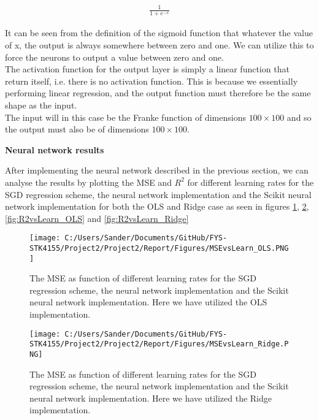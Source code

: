 \documentclass[12pt,a4paper]{article}
\begin{document}
\begin{equation}\label{eq:sig}
\begin{aligned}
\frac{1}{1 + e^{-x}}
\end{aligned}
\end{equation}

\noindent It can be seen from the definition of the sigmoid function that whatever the value of x, the output is always somewhere between zero and one. We can utilize this to force the neurons to output a value between zero and one.
\\
The activation function for the output layer is simply a linear function that return itself, i.e. there is no activation function. This is because we essentially performing linear regression, and the output function must therefore be the same shape as the input.
\\
The input will in this case be the Franke function of dimensions $100 \times 100$ and so the output must also be of dimensions $100 \times 100$. 

\begin{center}
\large{\textbf{Neural network results}}
\end{center}

\noindent After implementing the neural network described in the previous section, we can analyse the results by plotting the MSE and $R^2$ for different learning rates for the SGD regression scheme, the neural network implementation and the Scikit neural network implementation for both the OLS and Ridge case as seen in figures \ref{fig:MSEvsLearn_OLS}, \ref{fig:MSEvsLearn_Ridge}, \ref{fig:R2vsLearn_OLS} and \ref{fig:R2vsLearn_Ridge} 

\begin{figure}[H]
\centering
\texttt{[image: C:/Users/Sander/Documents/GitHub/FYS-STK4155/Project2/Project2/Report/Figures/MSEvsLearn\_OLS.PNG]}
\caption{\label{fig:MSEvsLearn_OLS} The MSE as function of different learning rates for the SGD regression scheme, the neural network implementation and the Scikit neural network implementation. Here we have utilized the OLS implementation.}
\end{figure}

\begin{figure}[H]
\centering
\texttt{[image: C:/Users/Sander/Documents/GitHub/FYS-STK4155/Project2/Project2/Report/Figures/MSEvsLearn\_Ridge.PNG]}
\caption{\label{fig:MSEvsLearn_Ridge} The MSE as function of different learning rates for the SGD regression scheme, the neural network implementation and the Scikit neural network implementation. Here we have utilized the Ridge implementation.}
\end{figure}
\end{document}
